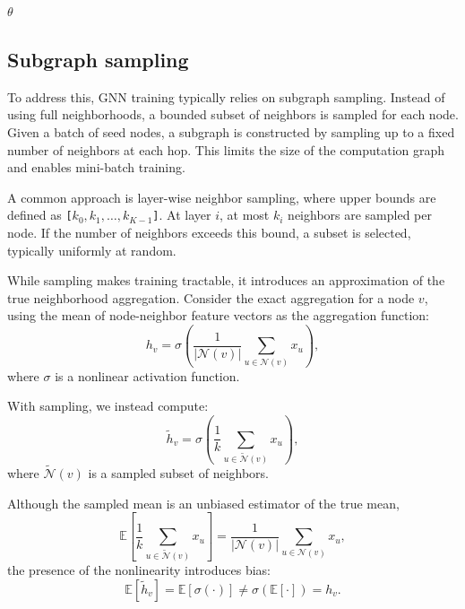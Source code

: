 \documentclass[PhD,single]{uclathes}
\begin{document}
\begin{algorithm}[H]
\label{algo:sampling}
\footnotesize
\caption{Mini-batch GNN Training (Single Epoch)}
\DontPrintSemicolon
{}
\KwOut{$\theta$}
\Return $\theta$\;
\end{algorithm}

\subsection{Subgraph sampling}
To address this, GNN training typically relies on subgraph sampling. Instead of
using full neighborhoods, a bounded subset of neighbors is sampled for each
node. Given a batch of seed nodes, a subgraph is constructed by sampling up to
a fixed number of neighbors at each hop. This limits the size of the
computation graph and enables mini-batch training.

A common approach is layer-wise neighbor sampling, where upper bounds are
defined as \texttt{[$k_0, k_1, \ldots, k_{K-1}$]}. At layer $i$, at most $k_i$
neighbors are sampled per node. If the number of neighbors exceeds this bound,
a subset is selected, typically uniformly at random.

While sampling makes training tractable, it introduces an approximation of the
true neighborhood aggregation. Consider the exact aggregation for a node $v$,
using the mean of node-neighbor feature vectors as the aggregation function:
\[
h_v = \sigma\!\left( \frac{1}{|\mathcal{N}(v)|} \sum_{u \in \mathcal{N}(v)} x_u \right),
\]
where $\sigma$ is a nonlinear activation function.

With sampling, we instead compute:
\[
\tilde{h}_v = \sigma\!\left( \frac{1}{k} \sum_{u \in \tilde{\mathcal{N}}(v)} x_u \right),
\]
where $\tilde{\mathcal{N}}(v)$ is a sampled subset of neighbors.

Although the sampled mean is an unbiased estimator of the true mean,
\[
\mathbb{E}\!\left[ \frac{1}{k} \sum_{u \in \tilde{\mathcal{N}}(v)} x_u \right]
=
\frac{1}{|\mathcal{N}(v)|} \sum_{u \in \mathcal{N}(v)} x_u,
\]
the presence of the nonlinearity introduces bias:
\[
\mathbb{E}[\tilde{h}_v]
=
\mathbb{E}\!\left[\sigma\!\left( \cdot \right)\right]
\neq
\sigma\!\left( \mathbb{E}[\cdot] \right)
=
h_v.
\]
\end{document}
